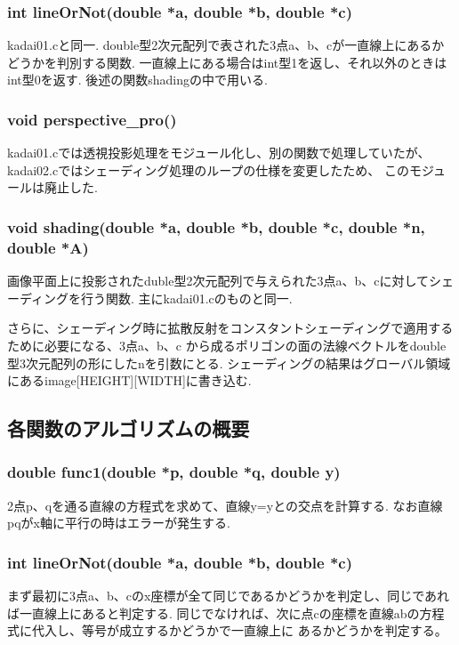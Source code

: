 \documentclass[a4j,dvipdfmx]{jsarticle}
\begin{document}
\subsubsection{int lineOrNot(double *a, double *b, double *c)}
kadai01.cと同一.
double型2次元配列で表された3点a、b、cが一直線上にあるかどうかを判別する関数.
一直線上にある場合はint型1を返し、それ以外のときはint型0を返す.
後述の関数shadingの中で用いる.

\subsubsection{void perspective\_pro()}
kadai01.cでは透視投影処理をモジュール化し、別の関数で処理していたが、
kadai02.cではシェーディング処理のループの仕様を変更したため、
このモジュールは廃止した.

\subsubsection{void shading(double *a, double *b, double *c, double *n, double *A)}
画像平面上に投影されたduble型2次元配列で与えられた3点a、b、cに対してシェーディングを行う関数.
主にkadai01.cのものと同一.



さらに、シェーディング時に拡散反射をコンスタントシェーディングで適用するために必要になる、3点a、b、c
から成るポリゴンの面の法線ベクトルをdouble型3次元配列の形にしたnを引数にとる.
シェーディングの結果はグローバル領域にあるimage[HEIGHT][WIDTH]に書き込む.

\subsection{各関数のアルゴリズムの概要}
\subsubsection{double func1(double *p, double *q, double y)}
2点p、qを通る直線の方程式を求めて、直線y=yとの交点を計算する.
なお直線pqがx軸に平行の時はエラーが発生する.

\subsubsection{int lineOrNot(double *a, double *b, double *c)}
まず最初に3点a、b、cのx座標が全て同じであるかどうかを判定し、同じであれば一直線上にあると判定する.
同じでなければ、次に点cの座標を直線abの方程式に代入し、等号が成立するかどうかで一直線上に
あるかどうかを判定する。
\end{document}
